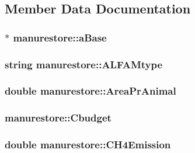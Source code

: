 \subsection{Member Data Documentation}
\hypertarget{classmanurestore_ac06eabf69498124decf382a8a373fae3}{
\subsubsection[{aBase}]{$\ast$ {\bf manurestore::aBase}}}
\label{classmanurestore_ac06eabf69498124decf382a8a373fae3}
\hypertarget{classmanurestore_ad8a98a02aa12b2e52d5d7a78f27cc5e6}{
\subsubsection[{ALFAMtype}]{\setlength{\rightskip}{0pt plus 5cm}string {\bf manurestore::ALFAMtype}}}
\label{classmanurestore_ad8a98a02aa12b2e52d5d7a78f27cc5e6}
\hypertarget{classmanurestore_a56e78af8ef392eb99640c2c33812052d}{
\subsubsection[{AreaPrAnimal}]{\setlength{\rightskip}{0pt plus 5cm}double {\bf manurestore::AreaPrAnimal}}}
\label{classmanurestore_a56e78af8ef392eb99640c2c33812052d}
\hypertarget{classmanurestore_a9bb652a6ec6a71e7bfcdb8a0cf73272b}{
\subsubsection[{Cbudget}]{ {\bf manurestore::Cbudget}}}
\label{classmanurestore_a9bb652a6ec6a71e7bfcdb8a0cf73272b}
\hypertarget{classmanurestore_ae472072caaaea49932fe2152e6a4fb09}{
\subsubsection[{CH4Emission}]{\setlength{\rightskip}{0pt plus 5cm}double {\bf manurestore::CH4Emission}}}
